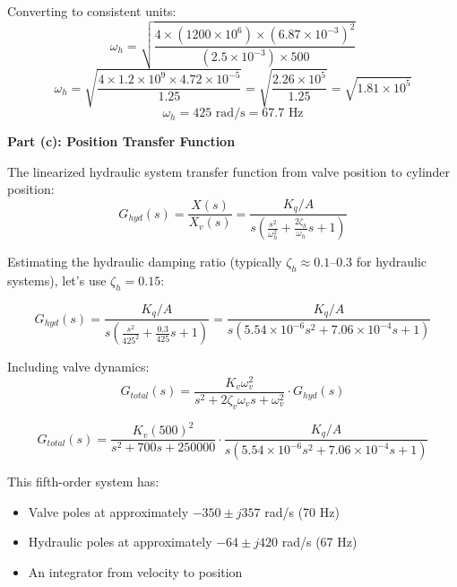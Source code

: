 Converting to consistent units:
\begin{equation}
    \omega_h = \sqrt{\frac{4 \times (1200 \times 10^6) \times (6.87 \times 10^{-3})^2}{(2.5 \times 10^{-3}) \times 500}}
\end{equation}
\begin{equation}
    \omega_h = \sqrt{\frac{4 \times 1.2 \times 10^9 \times 4.72 \times 10^{-5}}{1.25}} = \sqrt{\frac{2.26 \times 10^5}{1.25}} = \sqrt{1.81 \times 10^5}
\end{equation}
\begin{equation}
    \omega_h = 425 \text{ rad/s} = 67.7 \text{ Hz}
\end{equation}

\textbf{Part (c): Position Transfer Function}

The linearized hydraulic system transfer function from valve position to cylinder position:
\begin{equation}
    G_{hyd}(s) = \frac{X(s)}{X_v(s)} = \frac{K_q / A}{s\left(\frac{s^2}{\omega_h^2} + \frac{2\zeta_h}{\omega_h}s + 1\right)}
\end{equation}

Estimating the hydraulic damping ratio (typically $\zeta_h \approx 0.1$--0.3 for hydraulic systems), let's use $\zeta_h = 0.15$:

\begin{equation}
    G_{hyd}(s) = \frac{K_q / A}{s\left(\frac{s^2}{425^2} + \frac{0.3}{425}s + 1\right)} = \frac{K_q / A}{s\left(5.54 \times 10^{-6}s^2 + 7.06 \times 10^{-4}s + 1\right)}
\end{equation}

Including valve dynamics:
\begin{equation}
    G_{total}(s) = \frac{K_v \omega_v^2}{s^2 + 2\zeta_v \omega_v s + \omega_v^2} \cdot G_{hyd}(s)
\end{equation}

\begin{equation}
    \boxed{G_{total}(s) = \frac{K_v (500)^2}{s^2 + 700s + 250000} \cdot \frac{K_q / A}{s(5.54 \times 10^{-6}s^2 + 7.06 \times 10^{-4}s + 1)}}
\end{equation}

This fifth-order system has:
\begin{itemize}
    \item Valve poles at approximately $-350 \pm j357$ rad/s (70 Hz)
    \item Hydraulic poles at approximately $-64 \pm j420$ rad/s (67 Hz)
    \item An integrator from velocity to position
\end{itemize}

